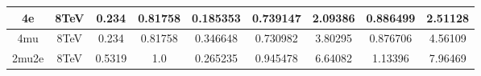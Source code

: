 \begin{table}[b]
\begin{tabular}{c c c c c c c c c}
4e & 8TeV & 0.234 & 0.81758 & 0.185353 & 0.739147
 & 2.09386%
 & 0.886499 & 2.51128 \\ \hline 4mu & 8TeV & 0.234 & 0.81758 & 0.346648 & 0.730982
 & 3.80295%
 & 0.876706 & 4.56109 \\ \hline 2mu2e & 8TeV & 0.5319 & 1.0  & 0.265235 & 0.945478
 & 6.64082%
 & 1.13396 & 7.96469 \\ \hline \hline 
\end{tabular}
\label{table:HZZ4lyieldcorr_spin2_min}
\end{table}


